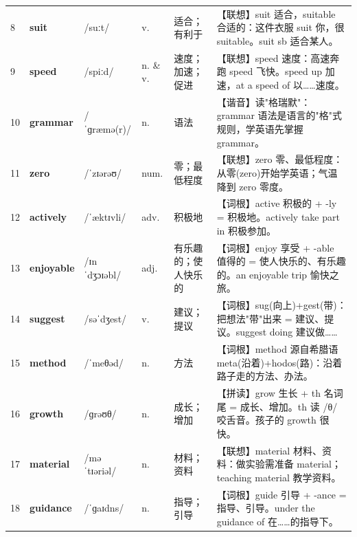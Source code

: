 \documentclass[UTF8,a4paper,11pt,oneside]{ctexbook}
\newcommand{\cellword}[1]{{\bfseries\textcolor{wordcol}{#1}}}
\newcommand{\cellipa}[1]{{\footnotesize\textcolor{ipacol}{#1}}}
\newcommand{\cellpos}[1]{\textcolor{poscol}{#1}}
\newcommand{\cellno}[1]{\textcolor{volcolor!75!black}{#1}}
\begin{document}
{\begin{longtable}{@{}C{0.045\textwidth}L{0.155\textwidth}L{0.175\textwidth}C{0.070\textwidth}L{0.180\textwidth}L{0.282\textwidth}@{}}
\cellno{8} & \cellword{suit} & \cellipa{/suːt/} & \cellpos{v.} & 适合；有利于 & \textcolor{tagAssoc}{【联想】}suit 适合，suitable 合适的：这件衣服 suit 你，很 suitable。suit sb 适合某人。 \\
 \cellno{9} & \cellword{speed} & \cellipa{/spiːd/} & \cellpos{n.  \& v.} & 速度；加速；促进 & \textcolor{tagAssoc}{【联想】}speed 速度：高速奔跑 speed 飞快。speed up 加速，at a speed of 以……速度。 \\
\cellno{10} & \cellword{grammar} & \cellipa{/ˈɡræmə(r)/} & \cellpos{n.} & 语法 & \textcolor{tagSound}{【谐音】}读"格瑞默"：grammar 语法是语言的"格"式规则，学英语先掌握 grammar。 \\
 \cellno{11} & \cellword{zero} & \cellipa{/ˈzɪərəʊ/} & \cellpos{num.} & 零；最低程度 & \textcolor{tagAssoc}{【联想】}zero 零、最低程度：从零(zero)开始学英语；气温降到 zero 零度。 \\
\cellno{12} & \cellword{actively} & \cellipa{/ˈæktɪvli/} & \cellpos{adv.} & 积极地 & \textcolor{tagRoot}{【词根】}active 积极的 + -ly = 积极地。actively take part in 积极参加。 \\
 \cellno{13} & \cellword{enjoyable} & \cellipa{/ɪnˈdʒɔɪəbl/} & \cellpos{adj.} & 有乐趣的；使人快乐的 & \textcolor{tagRoot}{【词根】}enjoy 享受 + -able 值得的 = 使人快乐的、有乐趣的。an enjoyable trip 愉快之旅。 \\
\cellno{14} & \cellword{suggest} & \cellipa{/səˈdʒest/} & \cellpos{v.} & 建议；提议 & \textcolor{tagRoot}{【词根】}sug(向上)+gest(带)：把想法"带"出来 = 建议、提议。suggest doing 建议做…… \\
 \cellno{15} & \cellword{method} & \cellipa{/ˈmeθəd/} & \cellpos{n.} & 方法 & \textcolor{tagRoot}{【词根】}method 源自希腊语 meta(沿着)+hodos(路)：沿着路子走的方法、办法。 \\
\cellno{16} & \cellword{growth} & \cellipa{/ɡrəʊθ/} & \cellpos{n.} & 成长；增加 & \textcolor{tagSpell}{【拼读】}grow 生长 + th 名词尾 = 成长、增加。th 读 /θ/ 咬舌音。孩子的 growth 很快。 \\
 \cellno{17} & \cellword{material} & \cellipa{/məˈtɪəriəl/} & \cellpos{n.} & 材料；资料 & \textcolor{tagAssoc}{【联想】}material 材料、资料：做实验需准备 material；teaching material 教学资料。 \\
\cellno{18} & \cellword{guidance} & \cellipa{/ˈɡaɪdns/} & \cellpos{n.} & 指导；引导 & \textcolor{tagRoot}{【词根】}guide 引导 + -ance = 指导、引导。under the guidance of 在……的指导下。 \\

\end{longtable}}
\end{document}
